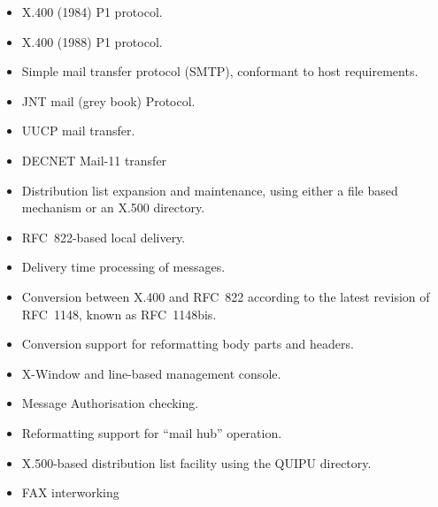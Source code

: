 \begin{itemize}
\item   X.400 (1984) P1 protocol.
\item	X.400 (1988) P1 protocol.
\item  	Simple mail transfer protocol (SMTP), conformant to
  host requirements.
\item   JNT mail (grey book) Protocol.
\item   UUCP mail transfer.
\item	DECNET Mail-11 transfer
\item	Distribution list expansion and maintenance, using either a
  file based mechanism or an X.500 directory.
\item   RFC~822-based local delivery.
\item	Delivery time processing of messages.
\item	Conversion between X.400 and RFC~822 according to  the latest
  revision of RFC~1148, known as RFC~1148bis.
\item	Conversion support for reformatting body parts and headers.
\item	X-Window and line-based management console.
\item   Message Authorisation checking.

\item   Reformatting support for ``mail hub'' operation.
\item	X.500-based distribution list facility using the QUIPU 
	directory.
\item	FAX interworking
\end{itemize}
